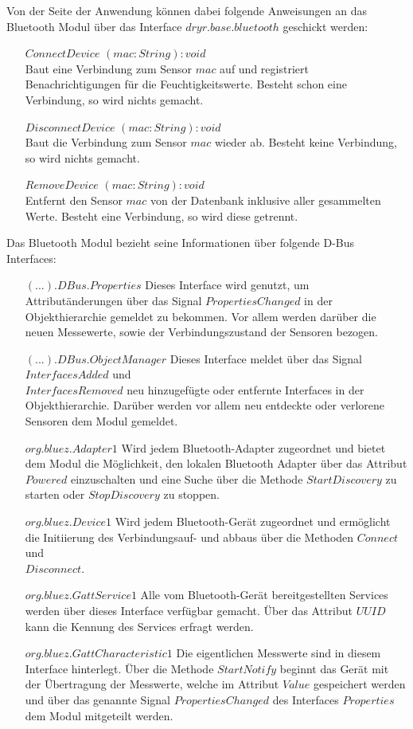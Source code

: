 Von der Seite der Anwendung können dabei folgende Anweisungen an das Bluetooth Modul über das Interface $dryr.base.bluetooth$ geschickt werden:
\begin{enumerate}
	\item[$ConnectDevice$] $(mac: String) : void$ \\
		Baut eine Verbindung zum Sensor $mac$ auf und registriert Benachrichtigungen für die Feuchtigkeitswerte. Besteht schon eine Verbindung, so wird nichts gemacht.
	\item[$DisconnectDevice$] $(mac: String) : void$ \\
		Baut die Verbindung zum Sensor $mac$ wieder ab. Besteht keine Verbindung, so wird nichts gemacht.
	\item[$RemoveDevice$] $(mac: String) : void$ \\
		Entfernt den Sensor $mac$ von der Datenbank inklusive aller gesammelten Werte. Besteht eine Verbindung, so wird diese getrennt.
\end{enumerate}

Das Bluetooth Modul bezieht seine Informationen über folgende D-Bus Interfaces:
\begin{enumerate}
	\item[$(...).DBus.Properties$]
		Dieses Interface wird genutzt, um Attributänderungen über das Signal $PropertiesChanged$ in der Objekthierarchie gemeldet zu bekommen. Vor allem werden darüber die neuen Messewerte, sowie der Verbindungszustand der Sensoren bezogen.
	\item[$(...).DBus.ObjectManager$]
		Dieses Interface meldet über das Signal $InterfacesAdded$ und \\ $InterfacesRemoved$ neu hinzugefügte oder entfernte Interfaces in der Objekthierarchie. Darüber werden vor allem neu entdeckte oder verlorene Sensoren dem Modul gemeldet.
	\item[$org.bluez.Adapter1$]
		Wird jedem Bluetooth-Adapter zugeordnet und bietet dem Modul die Möglichkeit, den lokalen Bluetooth Adapter über das Attribut $Powered$ einzuschalten und eine Suche über die Methode $StartDiscovery$ zu starten oder $StopDiscovery$ zu stoppen.
	\item[$org.bluez.Device1$]
		Wird jedem Bluetooth-Gerät zugeordnet und ermöglicht die Initiierung des Verbindungsauf- und abbaus über die Methoden $Connect$ und \\ $Disconnect$.
	\item[$org.bluez.GattService1$]
		Alle vom Bluetooth-Gerät bereitgestellten Services werden über dieses Interface verfügbar gemacht. Über das Attribut $UUID$ kann die Kennung des Services erfragt werden.
	\item[$org.bluez.GattCharacteristic1$]
		Die eigentlichen Messwerte sind in diesem Interface hinterlegt. Über die Methode $StartNotify$ beginnt das Gerät mit der Übertragung der Messwerte, welche im Attribut $Value$ gespeichert werden und über das genannte Signal $PropertiesChanged$ des Interfaces $Properties$ dem Modul mitgeteilt werden.
\end{enumerate}

